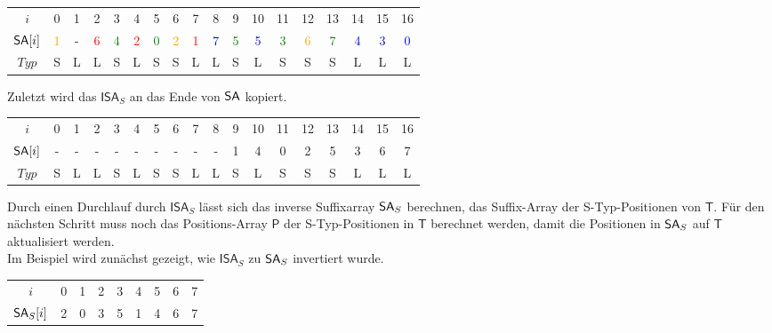 \begin{table}[H]
	\footnotesize
	\centering
	\begin{tabular}{c| c c c c c c c c c c c c c c c c c}
		$i$ & 0 & 1 & 2 & 3 & 4 & 5 & 6 & 7 & 8 & 9 & 10 & 11 & 12 & 13 & 14 & 15 & 16 \\
		$\sa[i]$ & \textcolor{orange}{1} & - & \textcolor{red}{6} & \textcolor{green}{4} & \textcolor{red}{2} & \textcolor{green}{0} & \textcolor{orange}{2} & \textcolor{red}{1} & \textcolor{blue}{7} & \textcolor{green}{5} & \textcolor{blue}{5} & \textcolor{green}{3} & \textcolor{orange}{6} & \textcolor{green}{7} & \textcolor{blue}{4} & \textcolor{blue}{3} & \textcolor{blue}{0} \\
		$Typ$ & S & L & L & S & L & S & S & L & L & S & L & S & S & S & L & L & L
	\end{tabular}
\end{table}

Zuletzt wird das $\mathsf{ISA}_S$ an das Ende von $\sa$ kopiert. 

\begin{table}[H]
	\footnotesize
	\centering
	\begin{tabular}{c| c c c c c c c c c c c c c c c c c}
		$i$ & 0 & 1 & 2 & 3 & 4 & 5 & 6 & 7 & 8 & 9 & 10 & 11 & 12 & 13 & 14 & 15 & 16 \\
		$\sa[i]$ & - & - & - & - & - & - & - & - & - & 1 & 4 & 0 & 2 & 5 & 3 & 6 & 7 \\
		$Typ$ & S & L & L & S & L & S & S & L & L & S & L & S & S & S & L & L & L
	\end{tabular}
\end{table}

Durch einen Durchlauf durch $\mathsf{ISA}_S$ lässt sich das inverse Suffixarray $\sa_{S}$ berechnen, das Suffix-Array der S-Typ-Positionen von $\mathsf{T}$. Für den nächsten Schritt muss noch das Positions-Array $\mathsf{P}$ der S-Typ-Positionen in $\mathsf{T}$ berechnet werden, damit die Positionen in $\sa_{S}$ auf $\mathsf{T}$ aktualisiert werden. \\
Im Beispiel wird zunächst gezeigt, wie $\mathsf{ISA}_S$ zu $\sa_{S}$ invertiert wurde.

\begin{table}[H]
	\footnotesize
	\centering
	\begin{tabular}{c| c c c c c c c c }
		$i$ & 0 & 1 & 2 & 3 & 4 & 5 & 6 & 7\\
		$\sa_{S}[i]$ & 2 & 0 & 3 & 5 & 1 & 4 & 6 & 7 
	\end{tabular}
\end{table}

